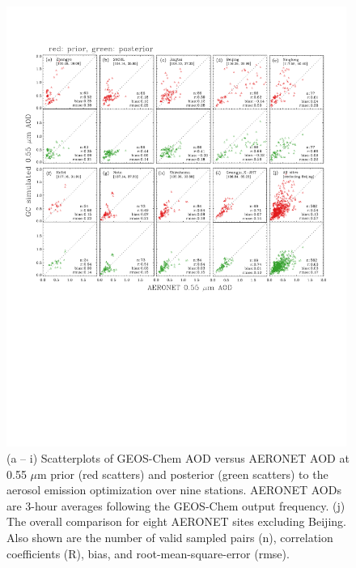  \begin{figure}[b]
  \centering
  \includegraphics[width={0.99\textwidth}]{figures/a6.pdf}  
  \caption{(a – i) Scatterplots of GEOS-Chem AOD versus AERONET AOD at 0.55 $\mu$m prior (red scatters) and posterior (green scatters) to the aerosol emission optimization over nine stations. AERONET AODs are 3-hour averages following the GEOS-Chem output frequency. (j) The overall comparison for eight AERONET sites excluding Beijing. Also shown are the number of valid sampled pairs (n), correlation coefficients (R), bias, and root-mean-square-error (rmse).}
  \label{fig:aeronet1}
 \end{figure}


